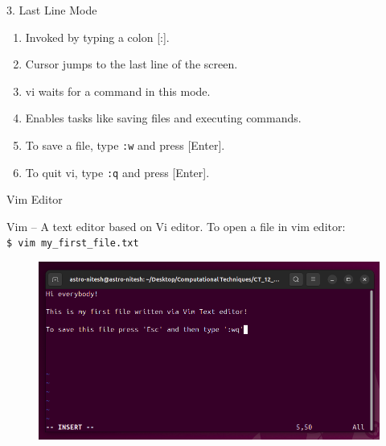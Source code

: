 \documentclass[aspectratio=169]{beamer}
\begin{document}
\begin{frame}{3. Last Line Mode}
    \begin{enumerate}
        \item Invoked by typing a colon [:].
        \item Cursor jumps to the last line of the screen.
        \item vi waits for a command in this mode.
        \item Enables tasks like saving files and executing commands.
        \item To save a file, type \texttt{:w} and press [Enter].
        \item To quit vi, type \texttt{:q} and press [Enter].
    \end{enumerate}
\end{frame}


\begin{frame}{Vim Editor}
    \begin{block}{Vim}
        -- A text editor based on Vi editor. 
        To open a file in vim editor:
        \\ \texttt{\$ vim my\_first\_file.txt}
    \end{block}

    \begin{figure}[htpb]
        \begin{center}
            \includegraphics[keepaspectratio, scale=0.25]{pic/vim_editor.png}
        \end{center}
    \end{figure}
\end{frame}
\end{document}
